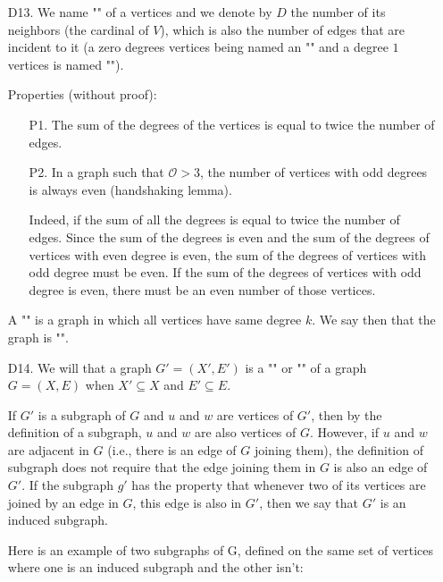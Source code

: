 {\begin{enumerate}
	\item[D13.]  We name "" of a vertices and we denote by $D$ the number of its neighbors (the cardinal of $V$), which is also the number of edges that are incident to it (a zero degrees vertices being named an "" and a degree $1$ vertices is named "").
	
	Properties (without proof):
	\begin{enumerate}
		\item[P1.] The sum of the degrees of the vertices is equal to twice the number of edges.
		
		\item[P2.] In a graph such that  $\mathcal{O}>3$, the number of vertices with odd degrees is always even (handshaking lemma).
		
		Indeed, if the sum of all the degrees is equal to twice the number of edges. Since the sum of the degrees is even and the sum of the degrees of vertices with even degree is even, the sum of the degrees of vertices with odd degree must be even. If the sum of the degrees of vertices with odd degree is even, there must be an even number of those vertices.
	\end{enumerate}
	\begin{tcolorbox}[title=Remark,colframe=black,arc=10pt]
	A "" is a graph in which all vertices have same degree $k$. We say then that the graph is "".
	\end{tcolorbox}
	
	\item[D14.] We will that a graph $G'=(X',E')$ is a "" or "" of a graph $G=(X,E)$ when $X' \subseteq X$ and $E' \subseteq E$.
	
	If $G'$ is a subgraph of $G$ and $u$ and $w$ are vertices of $G'$, then by the definition of a subgraph, $u$ and $w$ are also vertices of $G$. However, if $u$ and $w$ are adjacent in $G$ (i.e., there is an edge of $G$ joining them), the definition of subgraph does not require that the edge joining them in $G$ is also an edge of $G'$. If the subgraph $g'$ has the property that whenever two of its vertices are joined by an edge in $G$, this edge is also in $G'$, then we say that $G'$ is an induced subgraph. 
	
	Here is an example of two subgraphs of G, defined on the same set of vertices where one is an induced subgraph and the other isn't:
	

\end{enumerate}}
